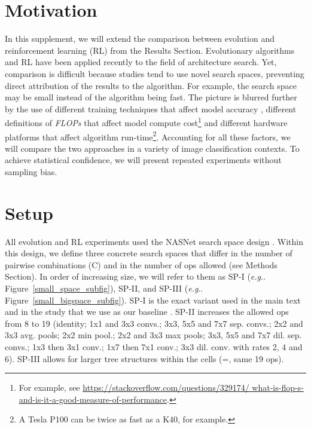 \documentclass[letterpaper]{article} \usepackage{aaai19}  \usepackage{times}  \usepackage{helvet}  \usepackage{courier}  \usepackage{graphicx}  \frenchspacing
\makeatletter
\DeclareRobustCommand\onedot{\futurelet\@let@token\@onedot}
\def\@onedot{\ifx\@let@token.\else.\null\fi\xspace}
\def\eg{\emph{e.g}\onedot}
\makeatother
\begin{document}
\section{Motivation}


In this supplement, we will extend the comparison between evolution and reinforcement learning (RL) from the Results Section. Evolutionary algorithms and RL have been applied recently to the field of architecture search. Yet, comparison is difficult because studies tend to use novel search spaces, preventing direct attribution of the results to the algorithm. For example, the search space may be small instead of the algorithm being fast. The picture is blurred further by the use of different training techniques that affect model accuracy \cite{ciregan2012multi,wan2013regularization,srivastava2014dropout}, different definitions of \textit{FLOPs} that affect model compute cost\footnote{For example, see \url{https://stackoverflow.com/questions/329174/ what-is-flop-s-and-is-it-a-good-measure-of-performance}.} and different hardware platforms that affect algorithm run-time\footnote{A Tesla P100 can be twice as fast as a K40, for example.}. Accounting for all these factors, we will compare the two approaches in a variety of image classification contexts. To achieve statistical confidence, we will present repeated experiments without sampling bias. \nocite{simmons2011false}


\section{Setup}


All evolution and RL experiments used the NASNet search space design \cite{zoph2017learning}. Within this design, we define three concrete search spaces that differ in the number of pairwise combinations (C) and in the number of ops allowed (see Methods Section). In order of increasing size, we will refer to them as SP-I (\eg Figure~\ref{small_space_subfig}), SP-II, and SP-III (\eg Figure~\ref{small_bigspace_subfig}). SP-I is the exact variant used in the main text and in the study that we use as our baseline \cite{zoph2017learning}. SP-II increases the allowed ops from 8 to 19 (identity; 1x1 and 3x3 convs.; 3x3, 5x5 and 7x7 sep. convs.; 2x2 and 3x3 avg. pools; 2x2 min pool.; 2x2 and 3x3 max pools; 3x3, 5x5 and 7x7 dil. sep. convs.; 1x3 then 3x1 conv.; 1x7 then 7x1 conv.; 3x3 dil. conv. with rates 2, 4 and 6). SP-III allows for larger tree structures within the cells (=, same 19 ops).
\end{document}
